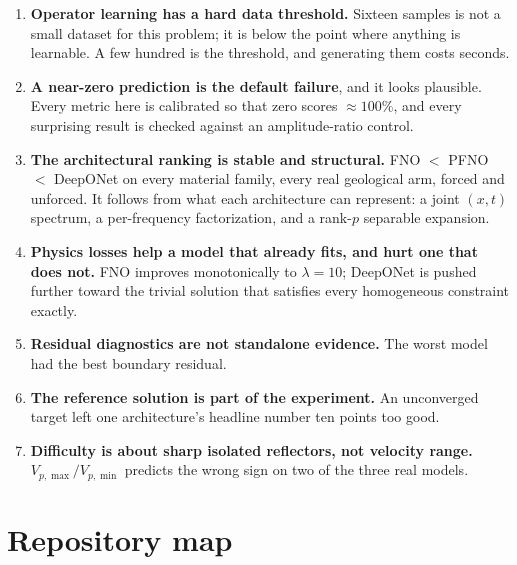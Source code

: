 \documentclass[11pt,a4paper]{article}
\begin{document}
\begin{enumerate}[leftmargin=*,itemsep=4pt]
\item \textbf{Operator learning has a hard data threshold.} Sixteen samples is
not a small dataset for this problem; it is below the point where anything is
learnable. A few hundred is the threshold, and generating them costs seconds.
\item \textbf{A near-zero prediction is the default failure}, and it looks
plausible. Every metric here is calibrated so that zero scores $\approx100\%$,
and every surprising result is checked against an amplitude-ratio control.
\item \textbf{The architectural ranking is stable and structural.} FNO $<$ PFNO
$<$ DeepONet on every material family, every real geological arm, forced and
unforced. It follows from what each architecture can represent: a joint $(x,t)$
spectrum, a per-frequency factorization, and a rank-$p$ separable expansion.
\item \textbf{Physics losses help a model that already fits, and hurt one that
does not.} FNO improves monotonically to $\lambda=10$; DeepONet is pushed
further toward the trivial solution that satisfies every homogeneous constraint
exactly.
\item \textbf{Residual diagnostics are not standalone evidence.} The worst model
had the best boundary residual.
\item \textbf{The reference solution is part of the experiment.} An unconverged
target left one architecture's headline number ten points too good.
\item \textbf{Difficulty is about sharp isolated reflectors, not velocity
range.} $V_{p,\max}/V_{p,\min}$ predicts the wrong sign on two of the three real
models.
\end{enumerate}

\section{Repository map}
\end{document}
